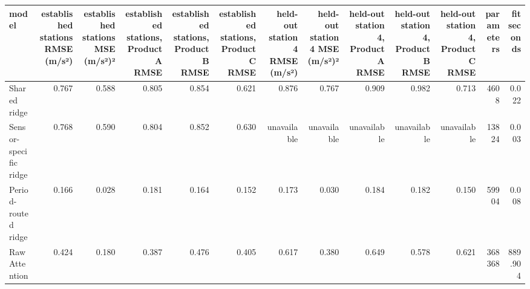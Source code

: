 \begin{tabular}{lrrrrrrrrrrrr}
\toprule
model & established stations RMSE (m/s²) & established stations MSE (m/s²)² & established stations, Product A RMSE & established stations, Product B RMSE & established stations, Product C RMSE & held-out station 4 RMSE (m/s²) & held-out station 4 MSE (m/s²)² & held-out station 4, Product A RMSE & held-out station 4, Product B RMSE & held-out station 4, Product C RMSE & parameters & fit seconds \\
\midrule
Shared ridge & 0.767 & 0.588 & 0.805 & 0.854 & 0.621 & 0.876 & 0.767 & 0.909 & 0.982 & 0.713 & 4608 & 0.022 \\
Sensor-specific ridge & 0.768 & 0.590 & 0.804 & 0.852 & 0.630 & unavailable & unavailable & unavailable & unavailable & unavailable & 13824 & 0.003 \\
Period-routed ridge & 0.166 & 0.028 & 0.181 & 0.164 & 0.152 & 0.173 & 0.030 & 0.184 & 0.182 & 0.150 & 59904 & 0.008 \\
Raw Attention & 0.424 & 0.180 & 0.387 & 0.476 & 0.405 & 0.617 & 0.380 & 0.649 & 0.578 & 0.621 & 368368 & 889.904 \\
\bottomrule
\end{tabular}
